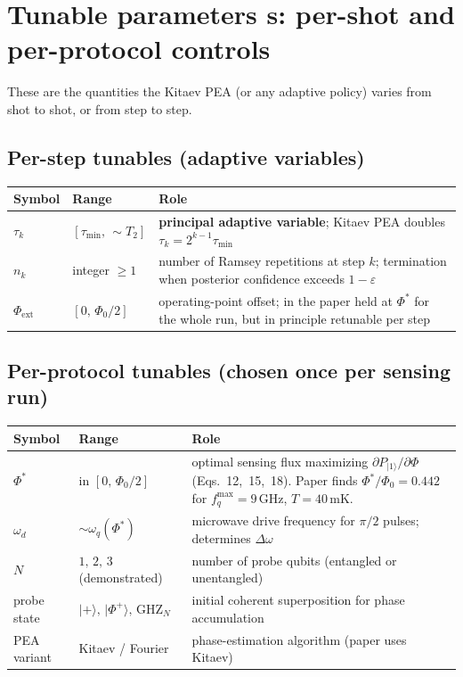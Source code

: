 \documentclass[11pt,a4paper]{article}
\newcommand{\Phizero}{\Phi_0}
\begin{document}
\section{Tunable parameters \texorpdfstring{$\bm{s}$}{s}: per-shot and per-protocol controls}
\label{sec:s_params}

These are the quantities the Kitaev PEA (or any adaptive policy) varies from shot to shot, or from step to step.

\subsection{Per-step tunables (adaptive variables)}

\begin{center}
\begin{tabular}{@{}lll@{}}
\toprule
Symbol & Range & Role \\
\midrule
$\tau_k$ & $[\tau_{\min},\,\sim T_2]$ & \textbf{principal adaptive variable}; Kitaev PEA doubles $\tau_k = 2^{k-1}\tau_{\min}$ \\
$n_k$ & integer $\geq 1$ & number of Ramsey repetitions at step $k$; termination when posterior confidence exceeds $1-\varepsilon$ \\
$\Phi_\text{ext}$ & $[0,\,\Phizero/2]$ & operating-point offset; in the paper held at $\Phi^*$ for the whole run, but in principle retunable per step \\
\bottomrule
\end{tabular}
\end{center}

\subsection{Per-protocol tunables (chosen once per sensing run)}

\begin{center}
\begin{tabular}{@{}lll@{}}
\toprule
Symbol & Range & Role \\
\midrule
$\Phi^*$ & in $[0,\,\Phizero/2]$ & optimal sensing flux maximizing $\partial P_{|1\rangle}/\partial\Phi$ (Eqs.~12,~15,~18). Paper finds $\Phi^*/\Phizero = 0.442$ for $f_q^{\max}=9\,$GHz, $T=40\,$mK. \\
$\omega_d$ & $\sim \omega_q(\Phi^*)$ & microwave drive frequency for $\pi/2$ pulses; determines $\Delta\omega$ \\
$N$ & $1,\,2,\,3$ (demonstrated) & number of probe qubits (entangled or unentangled) \\
probe state & $|+\rangle,\,|\Phi^+\rangle,\,\text{GHZ}_N$ & initial coherent superposition for phase accumulation \\
PEA variant & Kitaev / Fourier & phase-estimation algorithm (paper uses Kitaev) \\
\bottomrule
\end{tabular}
\end{center}
\end{document}
